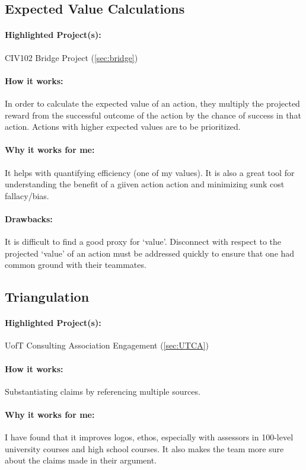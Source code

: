 \documentclass[a4paper,12pt]{article}
\begin{document}
\subsection{Expected Value Calculations}
\label{sec:value}
\paragraph{Highlighted Project(s): } CIV102 Bridge Project (\ref{sec:bridge})

\paragraph{How it works: }
In order to calculate the expected value of an action, they multiply the projected reward from the successful outcome of the action by the chance of success in that action. Actions with higher expected values are to be prioritized.

\paragraph{Why it works for me: }
It helps with quantifying efficiency (one of my values). It is also a great tool for understanding the benefit of a giiven action action and minimizing sunk cost fallacy/bias.

\paragraph{Drawbacks: }
It is difficult to find a good proxy for ‘value’. Disconnect with respect to the projected ‘value’ of an action must be addressed quickly to ensure that one had common ground with their teammates.

\subsection{Triangulation}
\label{sec:tri}
\paragraph{Highlighted Project(s): } UofT Consulting Association Engagement (\ref{sec:UTCA})

\paragraph{How it works: }
Substantiating claims by referencing multiple sources.

\paragraph{Why it works for me: }
I have found that it improves logos, ethos, especially with assessors in 100-level university courses and high school courses. It also makes the team more sure about the claims made in their argument.
\end{document}
